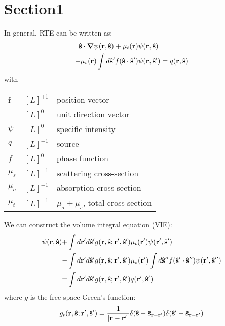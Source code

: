 \documentclass[main]{subfiles}
\begin{document}
\section{Section1}
\label{sec:Section1}

In general, RTE can be written as:
\begin{equation*}
	\begin{split}
		\mathbf{\hat{s}}\cdot\mbox{\boldmath$ \nabla $} \psi(\mathbf{r},\mathbf{\hat{s}})
		+\mu_t(\mathbf{r})&\psi(\mathbf{r},\mathbf{\hat{s}})
		\\
		-\mu_s(\mathbf{r})\int d\mathbf{\hat{s}}^\prime
		f(\mathbf{\hat{s}}\cdot\mathbf{\hat{s}}^{\prime})&\psi(\mathbf{r},\mathbf{\hat{s}}^{\prime})
		=q(\mathbf{r},\mathbf{\hat{s}})
	\end{split}
\end{equation*}
with
\begin{center} \begin{tabular}{lll}
	\v{r}	&	$[L]^{+1}$	& position vector		\\
	\uv{s}	&	$[L]^{0}$	& unit direction vector		\\
	$\psi$	&	$[L]^{0}$	& specific intensity		\\
	$q$	&	$[L]^{-1}$	& source			\\
	$f$	&	$[L]^{0}$	& phase function		\\
	$\mu_s$	&	$[L]^{-1}$	& scattering cross-section	\\
	$\mu_a$	&	$[L]^{-1}$	& absorption cross-section	\\
	$\mu_t$	&	$[L]^{-1}$	& $\mu_a+\mu_s$, total cross-section	\\
\end{tabular} \end{center}

We can construct the volume integral equation (VIE):
\begin{equation} \label{vie}
	\begin{split}
		\psi(\mathbf{r},\mathbf{\hat{s}}) +& \int d\mathbf{r}^{\prime} d\mathbf{\hat{s}}^{\prime}
		g(\mathbf{r},\mathbf{\hat{s}};\mathbf{r}^{\prime},\mathbf{\hat{s}}^{\prime})
		\mu_t(\mathbf{r}^{\prime})\psi(\mathbf{r}^{\prime},\mathbf{\hat{s}}^{\prime})
		\\
		-& \int d\mathbf{r}^{\prime} d\mathbf{\hat{s}}^{\prime} g(\mathbf{r},\mathbf{\hat{s}};\mathbf{r}^{\prime},\mathbf{\hat{s}}^{\prime})
		\mu_s(\mathbf{r}^{\prime}) \int d\mathbf{\hat{s}}^{{\prime\prime}}
		f(\mathbf{\hat{s}}^{\prime}\cdot\mathbf{\hat{s}}^{{\prime\prime}})\psi(\mathbf{r}^{\prime},\mathbf{\hat{s}}^{{\prime\prime}})
		\\
		=& \int d\mathbf{r}^{\prime} d\mathbf{\hat{s}}^{\prime}
		g(\mathbf{r},\mathbf{\hat{s}};\mathbf{r}^{\prime},\mathbf{\hat{s}}^{\prime})q(\mathbf{r}^{\prime},\mathbf{\hat{s}}^{\prime})
	\end{split}
\end{equation}
where $g$ is the free space Green's function:
\begin{equation} \label{gt}
	g_t(\mathbf{r},\mathbf{\hat{s}};\mathbf{r}^{\prime},\mathbf{\hat{s}}^{\prime}) = \frac{1}{\left| \mathbf{r}-\mathbf{r}^{\prime} \right|} 
	\delta(\mathbf{\hat{s}}-\mathbf{\hat{s}}_{\mathbf{r}-\mathbf{r}^{\prime}})
	\delta(\mathbf{\hat{s}}^{\prime}-\mathbf{\hat{s}}_{\mathbf{r}-\mathbf{r}^{\prime}})
\end{equation}
\end{document}
